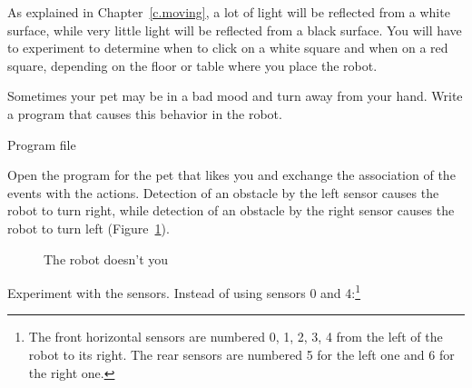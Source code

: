 
As explained in Chapter~\ref{c.moving}, a lot of light will be reflected
from a white surface, while very little light will be reflected from a
black surface. You will have to experiment to determine when to click on
a white square and when on a red square, depending on the floor or
table where you place the robot.

\newpage


Sometimes your pet may be in a bad mood and turn away from your hand.
Write a program that causes this behavior in the robot.

{\raggedleft \hfill Program file }

Open the program for the pet that likes you and exchange the association
of the events with the actions. Detection of an obstacle by the left
sensor causes the robot to turn right, while detection of an obstacle by
the right sensor causes the robot to turn left (Figure~\ref{fig.hates}).

\begin{figure}[htb]
\begin{center}
\caption{The robot doesn't you}\label{fig.hates}
\end{center}
\end{figure}


Experiment with the sensors. Instead of using sensors 0 and
4:\footnote{The front horizontal sensors are numbered 0, 1, 2, 3, 4 from
the left of the robot to its right. The rear sensors are numbered 5 for
the left one and 6 for the right one.}

